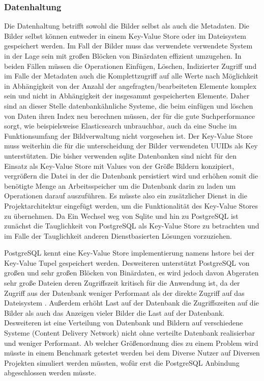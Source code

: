 \subsubsection{Datenhaltung}

Die Datenhaltung betrifft sowohl die Bilder selbst als auch die Metadaten. Die
Bilder selbst können entweder in einem Key-Value Store oder im Dateisystem
gespeichert werden. Im Fall der Bilder muss das verwendete verwendete System in
der Lage sein mit großen Blöcken von Binärdaten effizient umzugehen. In
beiden Fällen müssen die Operationen Einfügen, Löschen, Indizierter Zugriff und
im Falle der Metadaten auch die Komplettzugriff auf alle Werte nach Möglichkeit
in Abhängigkeit von der Anzahl der angefragten/bearbeiteten Elemente komplex
sein und nicht in Abhängigkeit der insgesammt gespeicherten Elemente. Daher sind
an dieser Stelle datenbankähnliche Systeme, die beim einfügen und löschen von
Daten ihren Index neu berechnen müssen, der für die gute Suchperformance sorgt,
wie beispielsweise Elasticsearch unbrauchbar, auch da eine Suche im
Funktionsumfang der Bildverwaltung nicht vorgesehen ist. Der Key-Value Store
muss weiterhin die für die unterscheidung der Bilder verwendeten UUIDs als Key
unterstützten. Die bisher verwenden sqlite Datenbanken sind nicht für den
Einsatz als Key-Value Store mit Values von der Größe Bildern konzipiert,
vergrößern die Datei in der die Datenbank persistiert wird und erhöhen somit die
benötigte Menge an Arbeitsspeicher um die Datenbank darin zu laden um
Operationen darauf auszuführen. Es müsste also ein zusätzlicher Dienst in die
Projektarchitektur eingefügt werden, um die Funktionalität des Key-Value Stores
zu übernehmen. Da Ein Wechsel weg von Sqlite und hin zu PostgreSQL ist zunächst
die Tauglichkeit von PostgreSQL als Key-Value Store zu betrachten und im Falle
der Tauglichkeit anderen Dienstbasierten Lösungen vorzuziehen.

PostgreSQL kennt eine Key-Value Store implementierung namens hstore
\cite{PostgreSQL-hstore} bei der Key-Value Tupel gespeichert werden. Desweiteren
unterstützt PostgreSQL von großen und sehr großen Blöcken von Binärdaten, es
wird jedoch davon Abgeraten sehr große Dateien deren Zugriffszeit kritisch für
die Anwendung ist, da der Zugriff aus der Datenbank weniger Performant als der
direkte Zugriff auf das Dateisystem \cite{PostgreSQL-blob}. Außerdem erhöht Last
auf der Datenbank die Zugriffszeiten auf die Bilder als auch das Anzeigen vieler
Bilder die Last auf der Datenbank. Desweiteren ist eine Verteilung von Datenbank
und Bildern auf verschiedene Systeme (Content Delivery Network) nicht ohne
verteilte Datenbank realisierbar und weniger Performant. Ab welcher
Größenordnung dies zu einem Problem wird müsste in einem Benchmark getestet
werden bei dem Diverse Nutzer auf Diversen Projekten simuliert werden müssten,
wofür erst die PostgreSQL Anbindung abgeschlossen werden müsste.

